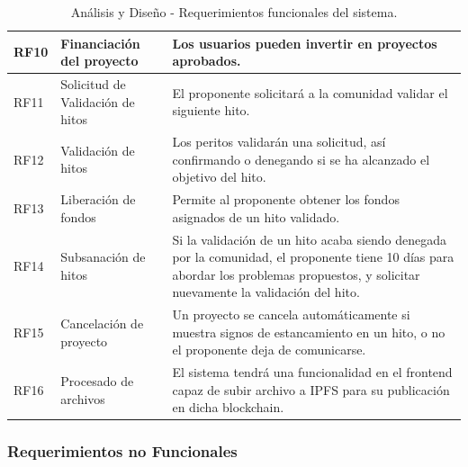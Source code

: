 \begin{table}[H]
\begin{tabular}{|p{1cm}|p{4cm}|p{10cm}|}
    \hline
    RF10 & Financiación del proyecto & Los usuarios pueden invertir en proyectos aprobados. \\
    \hline
    RF11 & Solicitud de Validación de hitos & El proponente solicitará a la comunidad validar el siguiente hito. \\
    \hline
    RF12 & Validación de hitos & Los peritos validarán una solicitud, así confirmando o denegando si se ha alcanzado el objetivo del hito. \\
    \hline
    RF13 & Liberación de fondos & Permite al proponente obtener los fondos asignados de un hito validado. \\
    \hline
    RF14 & Subsanación de hitos & Si la validación de un hito acaba siendo denegada por la comunidad, el proponente tiene 10 días para abordar los problemas propuestos, y solicitar nuevamente la validación del hito. \\
    \hline
    RF15 & Cancelación de proyecto & Un proyecto se cancela automáticamente si muestra signos de estancamiento en un hito, o no el proponente deja de comunicarse. \\
    \hline
    RF16 & Procesado de archivos & El sistema tendrá una funcionalidad en el frontend capaz de subir archivo a IPFS para su publicación en dicha blockchain. \\
    \hline
    
\end{tabular}
\caption{Análisis y Diseño - Requerimientos funcionales del sistema.}
\label{tab:requisitos_funcionales}
\end{table}

\newpage

\subsubsection{Requerimientos no Funcionales}

